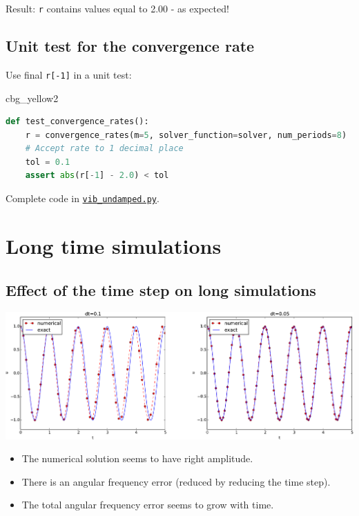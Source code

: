 \documentclass[%
oneside,                 %
final,                   %
10pt]{article}
\newenvironment{_cod_tight}[1]{
   \def\FrameCommand{\colorbox{#1}}
   \FrameRule0.6pt\MakeFramed {\FrameRestore}\vskip3mm}
   {\vskip0mm\endMakeFramed}
\newenvironment{cod}[1]{
\bgroup\rmfamily
\fboxsep=0mm\relax
\begin{_cod_tight}{#1}
\list{}{\parsep=-2mm\parskip=0mm\topsep=0pt\leftmargin=2mm
\rightmargin=2\leftmargin\leftmargin=4pt\relax}
\item\relax}
{\endlist\end{_cod_tight}\egroup}
\begin{document}
Result: \texttt{r} contains values equal to 2.00 - as expected!

\subsection*{Unit test for the convergence rate}

Use final \texttt{r[-1]} in a unit test:

\begin{cod}{cbg_yellow2}\begin{lstlisting}[language=Python,style=simple,xleftmargin=2mm]
def test_convergence_rates():
    r = convergence_rates(m=5, solver_function=solver, num_periods=8)
    # Accept rate to 1 decimal place
    tol = 0.1
    assert abs(r[-1] - 2.0) < tol
\end{lstlisting}\end{cod}
\noindent

Complete code in \href{{http://tinyurl.com/nm5587k/vib/vib_undamped.py}}{\nolinkurl{vib_undamped.py}}.

\section*{Long time simulations}
\label{vib:model1:longseries}

\subsection*{Effect of the time step on long simulations}



\centerline{\includegraphics[width=1.0\linewidth]{fig-vib/vib_freq_err1.pdf}}




\begin{itemize}
 \item The numerical solution seems to have right amplitude.

 \item There is an angular frequency error (reduced by reducing the time step).

 \item The total angular frequency error seems to grow with time.
\end{itemize}
\end{document}
